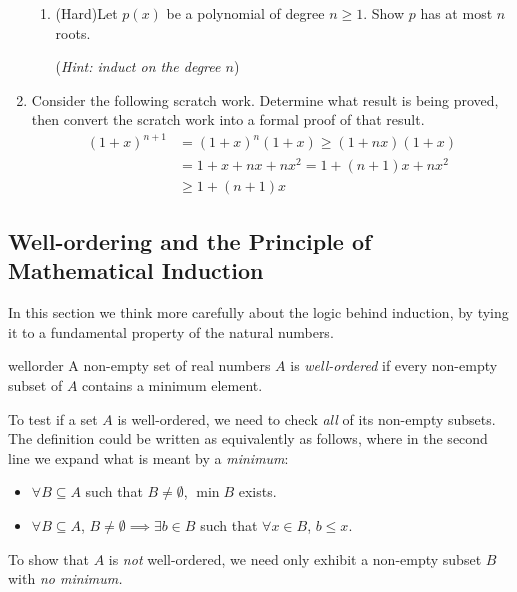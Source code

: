 \begin{exercises}{}{}
\begin{enumerate}
\begin{enumerate}
			\item (Hard)\lstsp Let $p(x)$ be a polynomial of degree $n\ge 1$. Show $p$ has at most $n$ roots.\par
			(\emph{Hint: induct on the degree $n$})
		\end{enumerate}


		\item Consider the following scratch work. Determine what result is being proved, then convert the scratch work into a formal proof of that result.
	  \begin{align*}
	    (1+x)^{n+1}&=(1+x)^n(1+x)\ge (1+nx)(1+x)\\
	    &=1+x+nx+nx^2=1+(n+1)x+nx^2\\
	    &\ge 1+(n+1)x
	  \end{align*}

	\end{enumerate}

\end{exercises}

\clearpage



\subsection{Well-ordering and the Principle of Mathematical Induction}\label{sec:wellorder}


In this section we think more carefully about the logic behind induction, by tying it to a fundamental property of the natural numbers.

\begin{defn}{}{wellorder}
	A non-empty set of real numbers $A$ is \emph{well-ordered} if every non-empty subset of $A$ contains a minimum element.
\end{defn}

To test if a set $A$ is well-ordered, we need to check \emph{all} of its non-empty subsets. The definition could be written as equivalently as follows, where in the second line we expand what is meant by a \emph{minimum}:
\begin{itemize}
  \item $\forall B\subseteq A$ such that $B\neq\emptyset$, $\min B$ exists.
  \item $\forall B\subseteq A$, $B\neq\emptyset\implies \exists b\in B$ such that $\forall x\in B$, $b\le x$.
\end{itemize}
To show that $A$ is \emph{not} well-ordered, we need only exhibit a non-empty subset $B$ with \emph{no minimum.}


